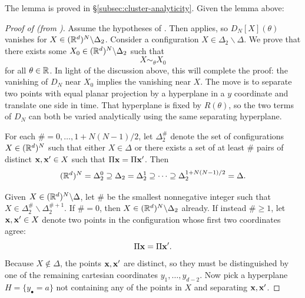 The lemma is proved in \S\ref{subsec:cluster-analyticity}. Given the lemma above:
\begin{proof}[Proof of  (from )]
Assume the hypotheses of . 
Then  applies, so $D_N[X](\theta)$ vanishes for $X\in (\mathbb{R}^d)^N\backslash \Delta_2$. 
Consider a configuration $X\in \Delta_2\backslash \Delta$.
We prove that there exists some $X_0 \in (\mathbb{R}^d)^N\backslash \Delta_2 $ such that 
\begin{equation}
    X\sim_\theta X_0 
\end{equation}
for all $\theta\in \mathbb{R}$. In light of the discussion above, this will complete the proof: the vanishing of $D_N$ near $X_0$ implies the vanishing near $X$.
The move is to separate two points with equal planar projection by a
hyperplane in a $y$ coordinate and translate one side in time. That
hyperplane is fixed by $R(\theta)$, so the two terms of $D_N$ can both
be varied analytically using the same separating hyperplane. 

    For each $\#=0,\dots,1+N(N-1)/2$, let $\Delta_2^\#$ denote the set of configurations $X\in (\mathbb{R}^d)^N$ such that either $X\in \Delta$ or there exists a set of at least $\#$ pairs of distinct $\mathbf{x},\mathbf{x}'\in X$ such that $\Pi \mathbf{x}=\Pi \mathbf{x}'$. Then 
    \begin{equation}
        (\mathbb{R}^d)^{N}=\Delta_2^0\supseteq \Delta_2=\Delta_2^1\supseteq \cdots \supseteq   \Delta_2^{1+N(N-1)/2}=\Delta  .
    \end{equation}

    Given $X\in (\mathbb{R}^d)^N\backslash \Delta$,
    let $\#$ be the smallest nonnegative integer such that $X\in \Delta_2^\#\backslash \Delta_2^{\#+1}$. 
    If $\#=0$, then $X\in (\mathbb{R}^d)^N\backslash \Delta_2$ already.
    If instead $\#\geq 1$, let $\mathbf{x},\mathbf{x}'\in X$ denote two points in the configuration whose first two coordinates agree:
    \begin{equation}
        \Pi \mathbf{x} = \Pi \mathbf{x}'. 
    \end{equation}
    Because $X\notin \Delta$, the points $\mathbf{x},\mathbf{x}'$ are distinct, so they must be distinguished by one of the remaining cartesian coordinates $y_1,\dots,y_{d-2}$. 
    Now pick a hyperplane $H=\{y_\bullet = a\}$ not containing any of the points in $X$ and separating $\mathbf{x},\mathbf{x}'$.  


\end{proof}
